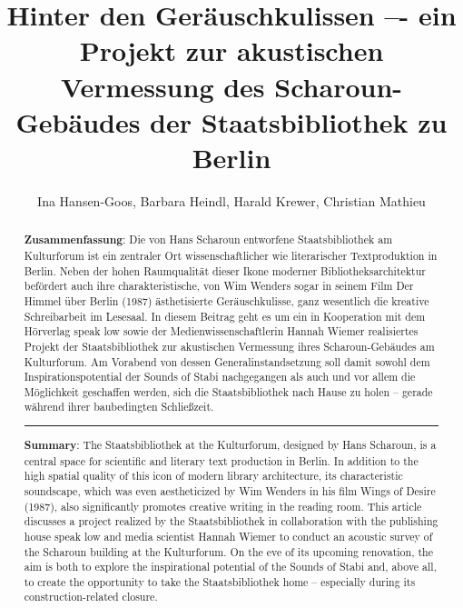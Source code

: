 \documentclass[a4paper,
fontsize=11pt,
oneside,
numbers=noperiodatend,
parskip=half-,
bibliography=totoc,
final
]{scrartcl}
\title{\LARGE{Hinter den Geräuschkulissen –- ein Projekt zur akustischen Vermessung des Scharoun-Gebäudes der Staatsbibliothek zu Berlin}} %
\author{Ina Hansen-Goos, Barbara Heindl, Harald Krewer, Christian Mathieu}
\date{}
\begin{document}
\maketitle
\thispagestyle{fancyplain} 

\begin{abstract}
\noindent
\textbf{Zusammenfassung}: Die von Hans Scharoun entworfene
Staatsbibliothek am Kulturforum ist ein zentraler Ort wissenschaftlicher
wie literarischer Textproduktion in Berlin. Neben der hohen Raumqualität
dieser Ikone moderner Bibliotheksarchitektur befördert auch ihre
charakteristische, von Wim Wenders sogar in seinem Film Der Himmel über
Berlin (1987) ästhetisierte Geräuschkulisse, ganz wesentlich die
kreative Schreibarbeit im Lesesaal. In diesem Beitrag geht es um ein in
Kooperation mit dem Hörverlag speak low sowie der
Medienwissenschaftlerin Hannah Wiemer realisiertes Projekt der
Staatsbibliothek zur akustischen Vermessung ihres Scharoun-Gebäudes am
Kulturforum. Am Vorabend von dessen Generalinstandsetzung soll damit
sowohl dem Inspirationspotential der Sounds of Stabi nachgegangen als
auch und vor allem die Möglichkeit geschaffen werden, sich die
Staatsbibliothek nach Hause zu holen -- gerade während ihrer
baubedingten Schließzeit.

\begin{center}\rule{0.5\linewidth}{0.5pt}\end{center}

\textbf{Summary}: The Staatsbibliothek at the Kulturforum, designed by
Hans Scharoun, is a central space for scientific and literary text
production in Berlin. In addition to the high spatial quality of this
icon of modern library architecture, its characteristic soundscape,
which was even aestheticized by Wim Wenders in his film Wings of Desire
(1987), also significantly promotes creative writing in the reading
room. This article discusses a project realized by the Staatsbibliothek
in collaboration with the publishing house speak low and media scientist
Hannah Wiemer to conduct an acoustic survey of the Scharoun building at
the Kulturforum. On the eve of its upcoming renovation, the aim is both
to explore the inspirational potential of the Sounds of Stabi and, above
all, to create the opportunity to take the Staatsbibliothek home --
especially during its construction-related closure.
\end{abstract}
\end{document}
